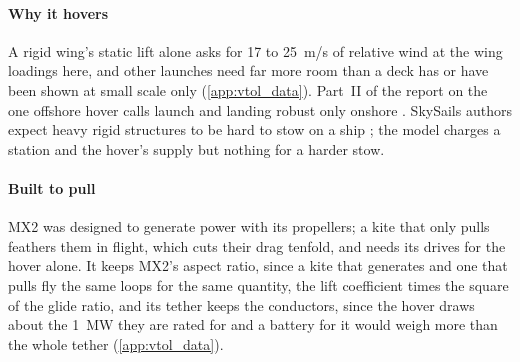 \paragraph{Why it hovers} A rigid wing's static lift alone asks for 17 to \SI{25}{m/s} of relative wind at the wing loadings here, and other launches need far more room than a deck has or have been shown at small scale only (\cref{app:vtol_data}). Part~II of the report on the one offshore hover calls launch and landing robust only onshore \citep{echeverri2020part2}. SkySails authors expect heavy rigid structures to be hard to stow on a ship \citep{paulig2013}; the model charges a station and the hover's supply but nothing for a harder stow.

\paragraph{Built to pull} MX2 was designed to generate power with its propellers; a kite that only pulls feathers them in flight, which cuts their drag tenfold, and needs its drives for the hover alone. It keeps MX2's aspect ratio, since a kite that generates and one that pulls fly the same loops for the same quantity, the lift coefficient times the square of the glide ratio, and its tether keeps the conductors, since the hover draws about the \SI{1}{MW} they are rated for and a battery for it would weigh more than the whole tether (\cref{app:vtol_data}).

